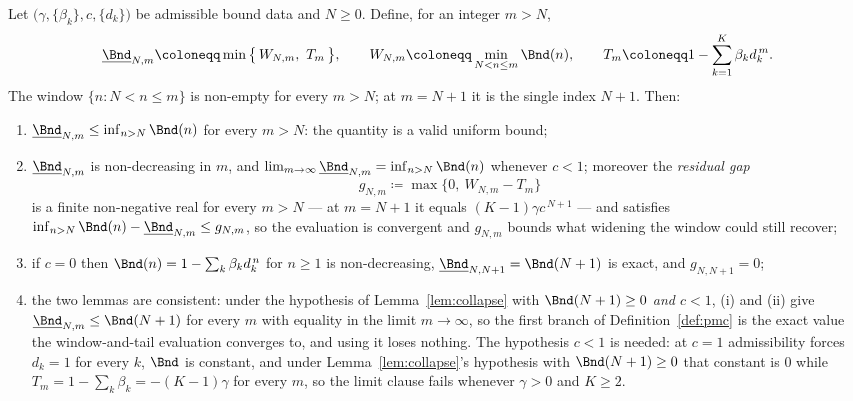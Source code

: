 \begin{lemma}\label{lem:windowtail}
Let $\big(\gamma,\{\beta_k\},c,\{d_k\}\big)$ be admissible bound data and
$N\ge0$. Define, for an integer $m>N$,
\begin{equation}\label{eq:windowtail}
  \underline{\Bnd}_{N,m}\coloneqq
  \min\big\{\,W_{N,m},\ T_m\,\big\},\qquad
  W_{N,m}\coloneqq\min_{N<n\le m}\Bnd(n),\qquad
  T_m\coloneqq1-\sum_{k=1}^{K}\beta_kd_k^{\,m} .
\end{equation}
The window $\{n:N<n\le m\}$ is non-empty for every $m>N$; at $m=N+1$ it is the
single index $N+1$. Then:
\begin{enumerate}[label=(\roman*),leftmargin=3.0em]
\item $\underline{\Bnd}_{N,m}\le\inf_{n>N}\Bnd(n)$ for every $m>N$: the
  quantity is a valid uniform bound;
\item $\underline{\Bnd}_{N,m}$ is non-decreasing in $m$, and
  $\lim_{m\to\infty}\underline{\Bnd}_{N,m}=\inf_{n>N}\Bnd(n)$ whenever
  $c<1$; moreover the \emph{residual gap}
  \begin{equation}\label{eq:resgap}
    g_{N,m}\coloneqq\max\big\{0,\ W_{N,m}-T_m\big\}
  \end{equation}
  is a finite non-negative real for every $m>N$ --- at $m=N+1$ it equals
  $(K-1)\gamma c^{\,N+1}$ --- and satisfies
  $\inf_{n>N}\Bnd(n)-\underline{\Bnd}_{N,m}\le g_{N,m}$, so the evaluation is
  convergent and $g_{N,m}$ bounds what widening the window could still recover;
\item if $c=0$ then $\Bnd(n)=1-\sum_k\beta_kd_k^{\,n}$ for $n\ge1$ is
  non-decreasing, $\underline{\Bnd}_{N,N+1}=\Bnd(N+1)$ is exact, and
  $g_{N,N+1}=0$;
\item the two lemmas are consistent: under the hypothesis of
  Lemma~\ref{lem:collapse} with $\Bnd(N+1)\ge0$ \emph{and $c<1$}, (i) and (ii)
  give $\underline{\Bnd}_{N,m}\le\Bnd(N+1)$ for every $m$ with equality in the
  limit $m\to\infty$, so the first branch of Definition~\ref{def:pmc} is the
  exact value the window-and-tail evaluation converges to, and using it loses
  nothing. The hypothesis $c<1$ is needed: at $c=1$ admissibility forces
  $d_k=1$ for every $k$, $\Bnd$ is constant, and under
  Lemma~\ref{lem:collapse}'s hypothesis with $\Bnd(N+1)\ge0$ that constant is
  $0$ while $T_m=1-\sum_k\beta_k=-(K-1)\gamma$ for every $m$, so the limit
  clause fails whenever $\gamma>0$ and $K\ge2$.
\end{enumerate}
\end{lemma}

